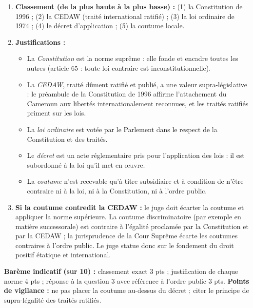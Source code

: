 \documentclass[11pt]{article}
\begin{document}
\begin{corrige}
\begin{enumerate}
\item \textbf{Classement (de la plus haute à la plus basse) :} (1) la Constitution de 1996 ; (2) la CEDAW (traité international ratifié) ; (3) la loi ordinaire de 1974 ; (4) le décret d'application ; (5) la coutume locale.
\item \textbf{Justifications :}
\begin{itemize}
\item La \emph{Constitution} est la norme suprême : elle fonde et encadre toutes les autres (article 65 : toute loi contraire est inconstitutionnelle).
\item La \emph{CEDAW}, traité dûment ratifié et publié, a une valeur supra-législative : le préambule de la Constitution de 1996 affirme l'attachement du Cameroun aux libertés internationalement reconnues, et les traités ratifiés priment sur les lois.
\item La \emph{loi ordinaire} est votée par le Parlement dans le respect de la Constitution et des traités.
\item Le \emph{décret} est un acte réglementaire pris pour l'application des lois : il est subordonné à la loi qu'il met en œuvre.
\item La \emph{coutume} n'est recevable qu'à titre subsidiaire et à condition de n'être contraire ni à la loi, ni à la Constitution, ni à l'ordre public.
\end{itemize}
\item \textbf{Si la coutume contredit la CEDAW :} le juge doit écarter la coutume et appliquer la norme supérieure. La coutume discriminatoire (par exemple en matière successorale) est contraire à l'égalité proclamée par la Constitution et par la CEDAW ; la jurisprudence de la Cour Suprême écarte les coutumes contraires à l'ordre public. Le juge statue donc sur le fondement du droit positif étatique et international.
\end{enumerate}
\textbf{Barème indicatif (sur 10) :} classement exact 3 pts ; justification de chaque norme 4 pts ; réponse à la question 3 avec référence à l'ordre public 3 pts.
\textbf{Points de vigilance :} ne pas placer la coutume au-dessus du décret ; citer le principe de supra-légalité des traités ratifiés.
\end{corrige}
\end{document}
